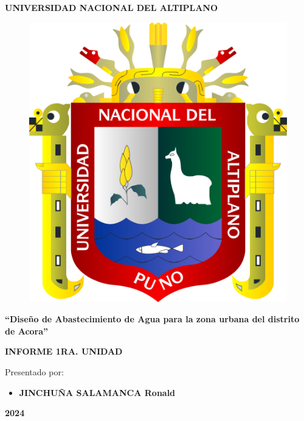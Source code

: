 \begin{titlepage}
    \thispagestyle{empty} %
    \begin{center}
        \begin{spacing}{2}
            {\Large \textbf{UNIVERSIDAD NACIONAL DEL ALTIPLANO}}\\   
        \end{spacing}
        
        \begin{figure}[h]
            \centering
            \includegraphics[scale=0.15]{logos/Logo_UNAP.png}
        \end{figure}
        \vspace{0.8cm}
        \begin{spacing}{1.5}
            {\LARGE \textbf{``Diseño de Abastecimiento de Agua para la zona urbana del distrito de Acora''}}
        \end{spacing}
        \vspace{1cm}
        \begin{spacing}{2}
            {\Huge \textbf{INFORME 1RA. UNIDAD}}
        \end{spacing}
        \vspace{1.5cm}
        {\large Presentado por:}
        \vspace{0.5cm}
        \begin{itemize}
            \item {\Large \textbf{JINCHUÑA SALAMANCA Ronald}}
        \end{itemize}
        
        \vfill
        {\Huge \textbf{2024}}

    \end{center}
\end{titlepage}